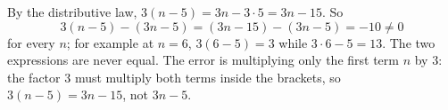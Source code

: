 By the distributive law, $3(n-5)=3n-3\cdot5=3n-15$. So
\[
3(n-5)-(3n-5)=(3n-15)-(3n-5)=-10\ne0
\]
for every $n$; for example at $n=6$, $3(6-5)=3$ while $3\cdot6-5=13$. The two expressions are never equal. The error is multiplying only the first term $n$ by $3$: the factor $3$ must multiply both terms inside the brackets, so $3(n-5)=\boxed{3n-15}$, not $3n-5$.
